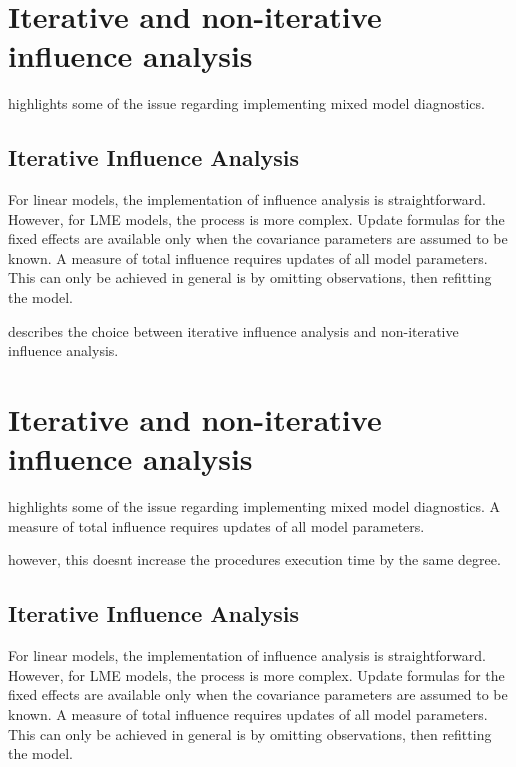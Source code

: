 \documentclass[Main.tex]{subfiles}
\begin{document}
		
		\newpage
		\section{Iterative and non-iterative influence analysis} %
		\citet{schabenberger} highlights some of the issue regarding implementing mixed model diagnostics.
		
		
		\subsection{Iterative Influence Analysis}
		
		For linear models, the implementation of influence analysis is straightforward.
		However, for LME models, the process is more complex. Update formulas for the fixed effects are available only when the covariance parameters are assumed to be known. A measure of total influence requires updates of all model parameters.
		This can only be achieved in general is by omitting observations, then refitting the model.
		
		\citet{schabenberger} describes the choice between  iterative influence analysis and  non-iterative influence analysis.
		
		
		
		\newpage
		\section{Iterative and non-iterative influence analysis} %
		\citet{schabenberger} highlights some of the issue regarding implementing mixed model diagnostics.
		A measure of total influence requires updates of all model parameters.
		
		however, this doesnt increase the procedures execution time by the same degree.
	\subsection{Iterative Influence Analysis}
	
	For linear models, the implementation of influence analysis is straightforward.
	However, for LME models, the process is more complex. Update formulas for the fixed effects are available only when the covariance parameters are assumed to be known. A measure of total influence requires updates of all model parameters.
	This can only be achieved in general is by omitting observations, then refitting the model.
	
\end{document}
